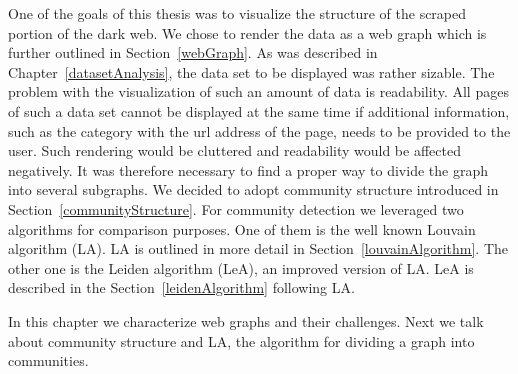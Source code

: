 \label{clustering}
One of the goals of this thesis was to visualize the structure of the scraped portion of the dark web. We chose to render the data as a web graph which is further outlined in Section~\ref{webGraph}. As was described in Chapter~\ref{datasetAnalysis}, the data set to be displayed was rather sizable. The problem with the visualization of such an amount of data is readability. All pages of such a data set cannot be displayed at the same time if additional information, such as the category with the url address of the page, needs to be provided to the user. Such rendering would be cluttered and readability would be affected negatively. It was therefore necessary to find a proper way to divide the graph into several subgraphs. We decided to adopt community structure introduced in Section~\ref{communityStructure}. For community detection we leveraged two algorithms for comparison purposes. One of them is the well known Louvain algorithm (LA). LA is outlined in more detail in Section~\ref{louvainAlgorithm}. The other one is the Leiden algorithm (LeA), an improved version of LA. LeA is described in the Section~\ref{leidenAlgorithm} following LA.

In this chapter we characterize web graphs and their challenges. Next we talk about community structure and LA, the algorithm for dividing a graph into communities. 
 
